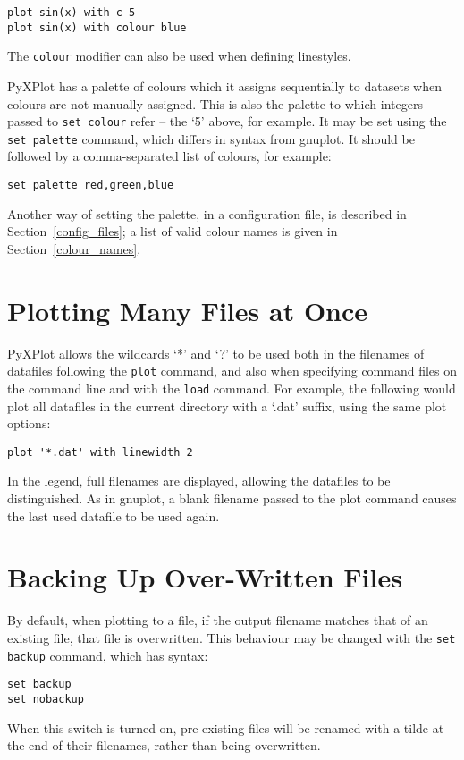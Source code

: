 \begin{verbatim}
plot sin(x) with c 5
plot sin(x) with colour blue
\end{verbatim}

\noindent The \texttt{colour} modifier can also be used when defining linestyles.

 PyXPlot has a palette of colours which it assigns
sequentially to datasets when colours are not manually assigned. This is also
the palette to which integers passed to \texttt{set colour} refer -- the `5'
above, for example. It may be set using the \texttt{set palette} command, which
differs in syntax from gnuplot. It should be followed by a comma-separated list
of colours, for example:

\begin{verbatim}
set palette red,green,blue
\end{verbatim}

Another way of setting the palette, in a configuration file, is described in
Section~\ref{config_files}; a list of valid colour names is given in
Section~\ref{colour_names}.

\section{Plotting Many Files at Once}


PyXPlot allows the wildcards `*' and `?' to be used both in the filenames of
datafiles following the \texttt{plot} command, and also when specifying command
files on the command line and with the \texttt{load} command. For example, the
following would plot all datafiles in the current directory with a `.dat'
suffix, using the same plot options:

\begin{verbatim}
plot '*.dat' with linewidth 2
\end{verbatim}

In the legend, full filenames are displayed, allowing the datafiles to be
distinguished.  As in gnuplot, a blank filename passed to the plot command
causes the last used datafile to be used again.

\section{Backing Up Over-Written Files}

\label{filebackup}

By default, when plotting to a file, if the output filename matches that of
an existing file, that file is overwritten. This behaviour may be changed with
the \texttt{set backup} command, which has syntax:

\begin{verbatim}
set backup
set nobackup
\end{verbatim}

When this switch is turned on, pre-existing files will be renamed with a tilde
at the end of their filenames, rather than being overwritten.

